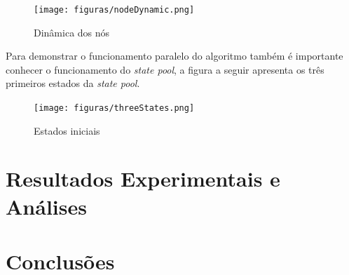 \documentclass{ufsc-thesis}
\begin{document}
\begin{figure}[H]
    \centering
    \texttt{[image: figuras/nodeDynamic.png]}
    \caption{Dinâmica dos nós}
    \label{fig:port}
\end{figure}

Para demonstrar o funcionamento paralelo do algoritmo também é importante conhecer o funcionamento do
\textit{state pool}, a figura a seguir apresenta os três primeiros estados da \textit{state pool}.

\begin{figure}[H]
    \centering
    \texttt{[image: figuras/threeStates.png]}
    \caption{Estados iniciais}
    \label{fig:port}
\end{figure}

\chapter{Resultados Experimentais e Análises}

\chapter{Conclusões}



\end{document}
